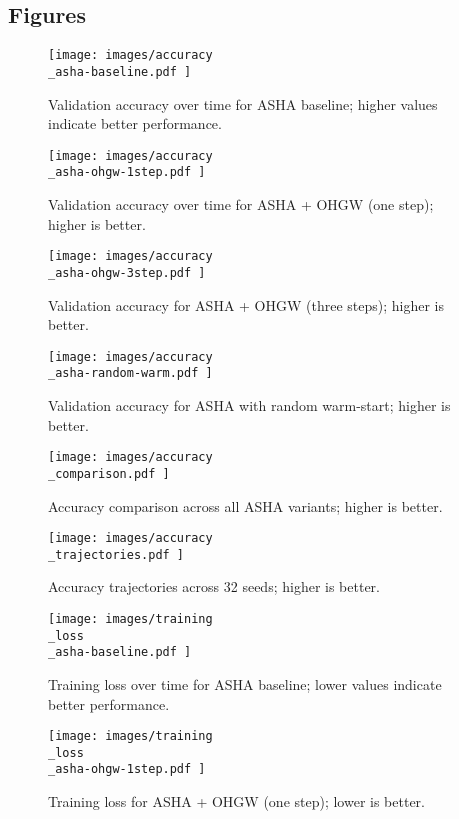 \documentclass{article}
\begin{document}
\subsection{Figures}
\begin{figure}[H]
    \centering
    \texttt{[image:  images/accuracy\\\_asha-baseline.pdf ]}
    \caption{Validation accuracy over time for ASHA baseline; higher values indicate better performance.}
\end{figure}

\begin{figure}[H]
    \centering
    \texttt{[image:  images/accuracy\\\_asha-ohgw-1step.pdf ]}
    \caption{Validation accuracy over time for ASHA + OHGW (one step); higher is better.}
\end{figure}

\begin{figure}[H]
    \centering
    \texttt{[image:  images/accuracy\\\_asha-ohgw-3step.pdf ]}
    \caption{Validation accuracy for ASHA + OHGW (three steps); higher is better.}
\end{figure}

\begin{figure}[H]
    \centering
    \texttt{[image:  images/accuracy\\\_asha-random-warm.pdf ]}
    \caption{Validation accuracy for ASHA with random warm-start; higher is better.}
\end{figure}

\begin{figure}[H]
    \centering
    \texttt{[image:  images/accuracy\\\_comparison.pdf ]}
    \caption{Accuracy comparison across all ASHA variants; higher is better.}
\end{figure}

\begin{figure}[H]
    \centering
    \texttt{[image:  images/accuracy\\\_trajectories.pdf ]}
    \caption{Accuracy trajectories across 32 seeds; higher is better.}
\end{figure}

\begin{figure}[H]
    \centering
    \texttt{[image:  images/training\\\_loss\\\_asha-baseline.pdf ]}
    \caption{Training loss over time for ASHA baseline; lower values indicate better performance.}
\end{figure}

\begin{figure}[H]
    \centering
    \texttt{[image:  images/training\\\_loss\\\_asha-ohgw-1step.pdf ]}
    \caption{Training loss for ASHA + OHGW (one step); lower is better.}
\end{figure}
\end{document}
